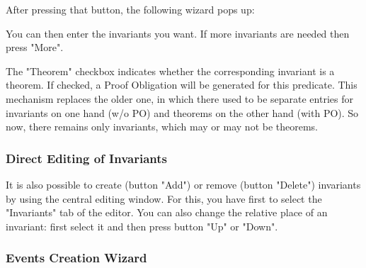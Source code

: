 
After pressing that button, the following wizard pops up: 


You can then enter the invariants you want. If more invariants are needed then press "More".

The "Theorem" checkbox indicates whether the corresponding invariant is a theorem. If checked, a Proof Obligation will be generated for this predicate. This mechanism replaces the older one, in which there used to be separate entries for invariants on one hand (w/o PO) and theorems on the other hand (with PO). So now, there remains only invariants, which may or may not be theorems.

\subsubsection{Direct Editing of Invariants}

It is also possible to create (button "Add") or remove (button "Delete") invariants by using the central editing window. For this, you have first to select the "Invariants" tab of the editor. You can also change the relative place of an invariant: first select it and then press button "Up" or "Down". 


\subsubsection{Events Creation Wizard}

